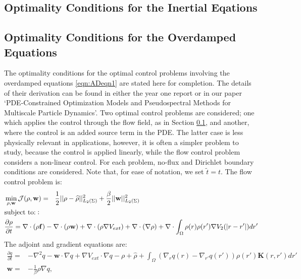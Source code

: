 \documentclass[11pt, a4paper]{article}
\theoremstyle{definition}
\newcommand{\Sta}{\rho}
\newcommand{\Adjb}{q}
\newcommand{\Con}{\mathbf{f}}
\begin{document}
\subsection{Optimality Conditions for the Inertial Eqations} \label{sec:INOptimalityConditions}




\subsection{Optimality Conditions for the Overdamped Equations}
The optimality conditions for the optimal control problems involving the overdamped equations \eqref{eqn:ADeqn1} are stated here for completion. The details of their derivation can be found in either the year one report or in our paper `PDE-Constrained Optimization Models and Pseudospectral Methods for Multiscale Particle Dynamics'.
Two optimal control problems are considered; one which applies the control through the flow field, as in Section \ref{sec:INOptimalityConditions}, and another, where the control is an added source term in the PDE. The latter case is less physically relevant in applications, however, it is often a simpler problem to study, because the control is applied linearly, while the flow control problem considers a non-linear control. For each problem, no-flux and Dirichlet boundary conditions are considered. Note that, for ease of notation, we set $\tilde t = t$.
The flow control problem is:
\begin{align}
\label{eqn:ADFlowOCP}
&\min_{\Sta,\mathbf{w} } \mathcal J(\Sta,\mathbf{w} ) =\ \ \frac{1}{2}||\Sta - \widehat \Sta||_{L_2(\Sigma)}^2  +\frac{\beta}{2}||\mathbf{w}||_{L_2(\Sigma)}^2\\
& \text{subject to:}: \notag\\
&\frac{\partial \Sta}{\partial t} = \nabla \cdot (\Sta\Con) - \nabla \cdot (\Sta \mathbf{w})  + \nabla \cdot (\rho\nabla V_{ext}) + \nabla \cdot (\nabla \rho) +\nabla \cdot \int_\Omega \Sta(r)\Sta(r') \nabla V_2(|r-r'|)dr' \notag
\end{align}
The adjoint and gradient equations are:
\begin{align*}
\frac{\partial \Adjb}{\partial t} =& - \nabla^2\Adjb - \mathbf{w} \cdot \nabla \Adjb + \nabla V_{ext} \cdot \nabla \Adjb - \Sta + \widehat \rho+\int_\Omega (\nabla_r \Adjb(r) - \nabla_{r'} \Adjb(r') ) \rho(r') \mathbf{K}(r,r') dr'\\
\mathbf{w} =& - \frac{1}{\beta} \Sta \nabla \Adjb,
\end{align*}
\end{document}
